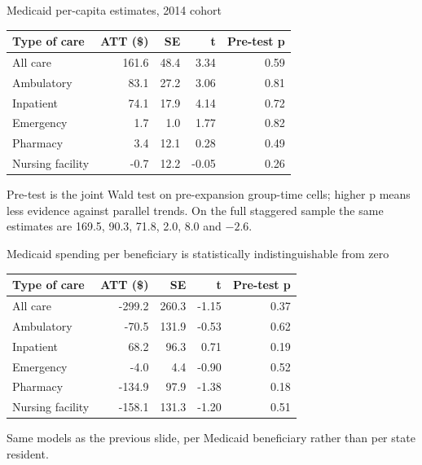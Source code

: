 \documentclass[aspectratio=169,11pt]{beamer}
\begin{document}
\begin{frame}{Medicaid per-capita estimates, 2014 cohort}
  \vspace{0.3cm}
  \begin{center}
  {\large
  \begin{tabular}{@{}l r r r r@{}}
    \toprule
    \textbf{Type of care} & \textbf{ATT (\$)} & \textbf{SE} & \textbf{t} & \textbf{Pre-test p} \\
    \midrule
    All care          & 161.6 & 48.4 & 3.34 & 0.59 \\
    Ambulatory        &  83.1 & 27.2 & 3.06 & 0.81 \\
    Inpatient         &  74.1 & 17.9 & 4.14 & 0.72 \\
    Emergency         &   1.7 &  1.0 & 1.77 & 0.82 \\
    Pharmacy          &   3.4 & 12.1 & 0.28 & 0.49 \\
    Nursing facility  &  -0.7 & 12.2 & -0.05 & 0.26 \\
    \bottomrule
  \end{tabular}}
  \end{center}
  \vspace{0.4cm}
  {\footnotesize\color{WarmGray} Pre-test is the joint Wald test on pre-expansion group-time cells; higher p means less evidence against parallel trends. On the full staggered sample the same estimates are 169.5, 90.3, 71.8, 2.0, 8.0 and $-2.6$.}
\end{frame}

\begin{frame}{Medicaid spending per beneficiary is statistically indistinguishable from zero}
  \vspace{0.3cm}
  \begin{center}
  {\large
  \begin{tabular}{@{}l r r r r@{}}
    \toprule
    \textbf{Type of care} & \textbf{ATT (\$)} & \textbf{SE} & \textbf{t} & \textbf{Pre-test p} \\
    \midrule
    All care          & -299.2 & 260.3 & -1.15 & 0.37 \\
    Ambulatory        &  -70.5 & 131.9 & -0.53 & 0.62 \\
    Inpatient         &   68.2 &  96.3 &  0.71 & 0.19 \\
    Emergency         &   -4.0 &   4.4 & -0.90 & 0.52 \\
    Pharmacy          & -134.9 &  97.9 & -1.38 & 0.18 \\
    Nursing facility  & -158.1 & 131.3 & -1.20 & 0.51 \\
    \bottomrule
  \end{tabular}}
  \end{center}
  \vspace{0.4cm}
  {\footnotesize\color{WarmGray} Same models as the previous slide, per Medicaid beneficiary rather than per state resident.}
\end{frame}
\end{document}
